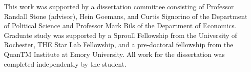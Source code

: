 This work was supported by a dissertation committee consisting of Professor Randall Stone (advisor), Hein Goemans, and Curtis Signorino of the Department of Political Science and Professor Mark Bils of the Department of Economics.
Graduate study was supported by a Sproull Fellowship from the University of Rochester,
THE Star Lab Fellowship, and a pre-doctoral fellowship from the QuanTM Institute at Emory University.
All work for the dissertation was completed independently by the student.

